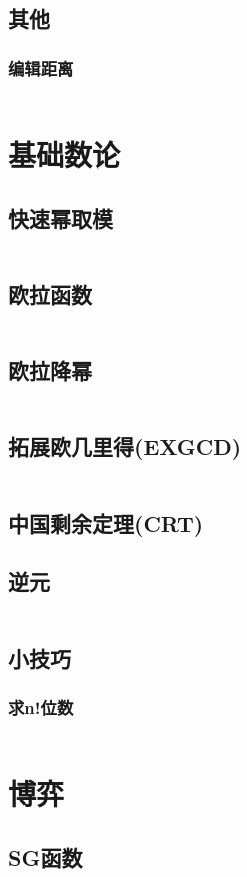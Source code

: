 \documentclass[a4paper,11pt]{article}
\begin{document}
\subsection{其他}
\subsubsection{编辑距离}
\inputminted[]{c++}{Template/DynamicProgramming/LevenshteinDistance.cpp}
\section{基础数论}
\subsection{快速幂取模}
\inputminted[]{c++}{Template/Math/PowMod.cpp}
\subsection{欧拉函数}
\inputminted[]{c++}{Template/Math/Euler.cpp}
\subsection{欧拉降幂}
\inputminted[]{c++}{Template/Math/EulerPower.cpp}
\subsection{拓展欧几里得(EXGCD)}
\inputminted[]{c++}{Template/Math/exgcd.cpp}
\subsection{中国剩余定理(CRT)}

\subsection{逆元}
\inputminted[]{c++}{Template/Math/Inverse.cpp}
\subsection{小技巧}
\subsubsection{求n!位数}
\inputminted[]{c++}{Template/Math/CountN!.cpp}
\section{博弈}
\subsection{SG函数}
\inputminted[]{c++}{Template/Game/SG.cpp}
\end{document}
